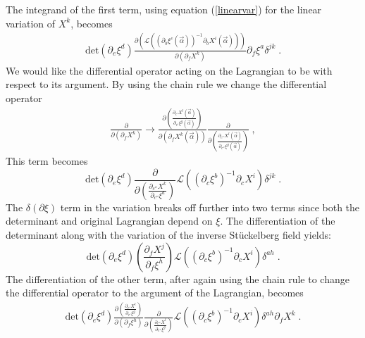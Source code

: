 \documentclass[%
 reprint,
 amsmath,amssymb,
 aps,
]{revtex4-1}
\begin{document}
The integrand of the first term, using equation (\ref{linearvar}) for
the linear variation of $X^k$, becomes
\begin{eqnarray}
    \mathrm{det}(\partial_e \xi^d)
    \frac{\partial \left(
    \mathcal{L}\left( \left( \partial_b \xi^c (\vec{\alpha}) \right)^{-1}
    \partial_b X^i(\vec{\alpha}) \right) \right)}{\partial \left(
    \partial_f X^k \right)} \partial_f \xi^a \delta^{j k} \; . \nonumber
\end{eqnarray}
We would like the differential operator acting on the Lagrangian to be with respect to its argument.
By using the chain rule we change the differential operator
\begin{eqnarray}
    \frac{\partial}{\partial (\partial_f X^k) } \rightarrow
    \frac{\partial \left( \frac{\partial_{c'} X^l (\vec{\alpha})}{\partial_{c'}
    \xi^g (\vec{\alpha}) } \right)}{\partial ( \partial_f
    X^k (\vec{\alpha}) ) } \frac{\partial}{\partial \left( \frac{\partial_{c''} X^l
    (\vec{\alpha}) }{\partial_{c''} \xi^g (\vec{\alpha}) } \right)} \; , \nonumber
\end{eqnarray}
This term becomes
\begin{equation}
\label{term1}
    \mathrm{det} ( \partial_e \xi^d )
    \frac{\partial}{\partial \left( \frac{\partial_{c''} X^k}{\partial_{c''} \xi^a} \right)}
    \mathcal{L}\left( (\partial_c \xi^b)^{-1} \partial_c X^i \right) \delta^{j k} \; .
\end{equation}
The $\delta (\partial\xi)$ term in the variation breaks off further into two terms since both the determinant and original
Lagrangian depend on $\xi$. The differentiation of the determinant along with the variation of the inverse St\"uckelberg
field yields:
\begin{equation}
\label{term2}
    \mathrm{det} ( \partial_e \xi^d ) \left( \frac{\partial_f X^j}{\partial_f \xi^h}
    \right) \mathcal{L} \left( (\partial_c \xi^b )^{-1} \partial_c X^i \right) \delta^{a h} \; .
\end{equation}
The differentiation of the other term, after again using the chain rule to change the differential
operator to the argument of the Lagrangian, becomes
\begin{eqnarray}
    \mathrm{det} ( \partial_e \xi^d )
    \frac{\partial \left( \frac{\partial_{c'} X^l}{\partial_{c'} \xi^g} \right)}{\partial
    \left( \partial_f \xi^h \right)}
    \frac{\partial}{\partial \left( \frac{\partial_{c''} X^l}{\partial_{c''} \xi^g} \right)}
    \mathcal{L} \left( (\partial_c \xi^b)^{-1} \partial_c X^i \right) \delta^{a h}
    \partial_f X^k \; . \nonumber
\end{eqnarray}
\end{document}

